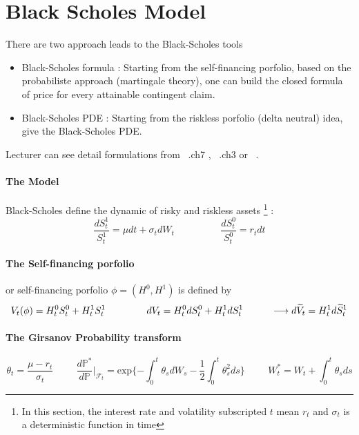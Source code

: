 \documentclass[a4paper,10pt]{article}
\begin{document}
\section{Black Scholes Model}
There are two approach leads to the Black-Scholes tools
\begin{itemize}
 \item Black-Scholes formula : Starting from the self-financing porfolio, based on the probabiliste approach (martingale theory), one can build the closed formula of price for every attainable contingent claim. 
 \item Black-Scholes PDE : Starting from the riskless porfolio (delta neutral) idea, give the Black-Scholes PDE.
\end{itemize}
Lecturer can see detail formulations from ~\cite{ELLIOT}.ch7 , ~\cite{MAREK}.ch3 or ~\cite{rouah}.  
\paragraph{The Model} Black-Scholes define the dynamic of risky and riskless assets \footnote{In this section, the interest rate and volatility subscripted $t$ mean $r_t$ and $\sigma_t$ is a deterministic function in time} :
\[
\frac{dS^1_t}{S^1_t} = \mu dt + \sigma_t d W_t   \hspace{2cm} \frac{dS^0_t}{S^0_t} = r_t dt
\]
\paragraph{The Self-financing porfolio} or self-financing porfolio $\phi = (H^0,H^1)$ is defined by
\[
V_t(\phi) = H^0_t S^0_t + H^1_t S^1_t   
\hspace{1.5cm} 
dV_t = H^0_t dS^0_t + H^1_t dS^1_t 
\hspace{1cm} \longrightarrow
d\widetilde{V}_t = H^1_t d\widetilde{S}^1_t 
\]
\paragraph{The Girsanov Probability transform}
\[
\theta_t = \frac{\mu - r_t}{\sigma_t} 
\hspace{1cm} 
\frac{d\mathbb{P}^*}{d\mathbb{P}}|_{\mathcal{F}_t} = \text{exp}\{ -\int_0^t \theta_s dW_s - \frac{1}{2} \int_0^t \theta^2_s ds \}
\hspace{1cm} 
W^*_t = W_t + \int_0^t \theta_s ds
\]
\end{document}
